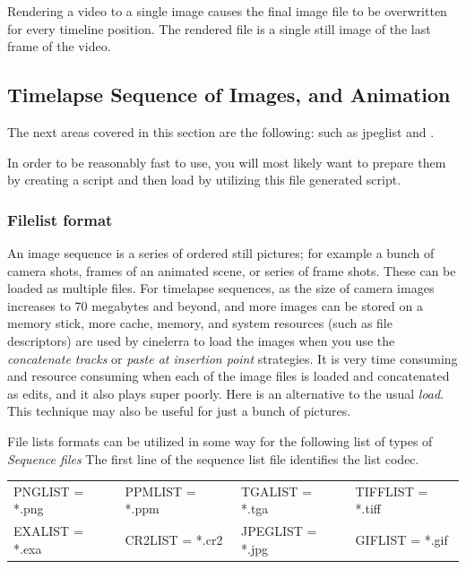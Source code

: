 Rendering a video to a single image causes the final image file to be overwritten for every timeline position. The rendered file is a single still image of the last frame of the video.

\subsection{Timelapse Sequence of Images, and Animation}%
\label{sub:timelaps_sequence_images_animation}

The next areas covered in this section are the following: 
 such as jpeglist and .

In order to be reasonably fast to use, you will most likely want to prepare them by creating a script and then load by utilizing this file generated script.

\subsubsection{Filelist format}%
\label{ssub:filelist_format}

An image sequence is a series of ordered still pictures; for example a bunch of camera shots, frames of an animated scene, or series of frame shots. These can be loaded as multiple files. For timelapse sequences, as the size of camera images increases to 70 megabytes and beyond, and more images can be stored on a memory stick, more cache, memory, and system resources (such as file descriptors) are used by cinelerra to load the images when you use the \textit{concatenate tracks} or \textit{paste at insertion point} strategies.  It is very time consuming and resource consuming when each of the image files is loaded and concatenated as edits, and it also plays super poorly.  Here is an alternative to the usual \textit{load}.  This technique may also be useful for just a bunch of pictures.

File lists formats can be utilized in some way for the following list of types of \textit{Sequence files}  The first line of the sequence list file identifies the list codec.



\begin{center}
    \begin{tabular}{l l l l}
    PNGLIST = *.png	&	PPMLIST = *.ppm	&	TGALIST = *.tga	  &  TIFFLIST = *.tiff \\
    EXALIST = *.exa	&	CR2LIST = *.cr2	&	JPEGLIST = *.jpg	&    GIFLIST = *.gif
    \end{tabular}
\end{center}

